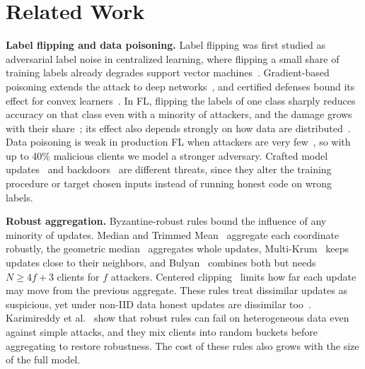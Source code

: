 \documentclass[conference]{IEEEtran}
\begin{document}
\section{Related Work}
\label{sec:related}
\textbf{Label flipping and data poisoning.} Label flipping was first studied as adversarial label noise in centralized learning, where flipping a small share of training labels already degrades support vector machines~\cite{biggio2011support}. Gradient-based poisoning extends the attack to deep networks~\cite{munoz2017towards}, and certified defenses bound its effect for convex learners~\cite{steinhardt2017certified}. In FL, flipping the labels of one class sharply reduces accuracy on that class even with a minority of attackers, and the damage grows with their share~\cite{tolpegin2020data}; its effect also depends strongly on how data are distributed~\cite{lavaur2024systematic}. Data poisoning is weak in production FL when attackers are very few~\cite{shejwalkar2022backdrawingboard}, so with up to 40\% malicious clients we model a stronger adversary. Crafted model updates~\cite{bhagoji2019analyzing,fang2020local,shejwalkar2021manipulating} and backdoors~\cite{bagdasaryan2020backdoor,wang2020attack,sun2019really} are different threats, since they alter the training procedure or target chosen inputs instead of running honest code on wrong labels.

\textbf{Robust aggregation.} Byzantine-robust rules bound the influence of any minority of updates. Median and Trimmed Mean~\cite{yin2018byzantine} aggregate each coordinate robustly, the geometric median~\cite{pillutla2022robust} aggregates whole updates, Multi-Krum~\cite{NIPS2017_f4b9ec30} keeps updates close to their neighbors, and Bulyan~\cite{mhamdi2018hidden} combines both but needs $N\ge4f+3$ clients for $f$ attackers. Centered clipping~\cite{karimireddy2021history} limits how far each update may move from the previous aggregate. These rules treat dissimilar updates as suspicious, yet under non-IID data honest updates are dissimilar too~\cite{zhao2018noniid,li2020federated}. Karimireddy et al.~\cite{karimireddy2022bucketing} show that robust rules can fail on heterogeneous data even against simple attacks, and they mix clients into random buckets before aggregating to restore robustness. The cost of these rules also grows with the size of the full model.
\end{document}
